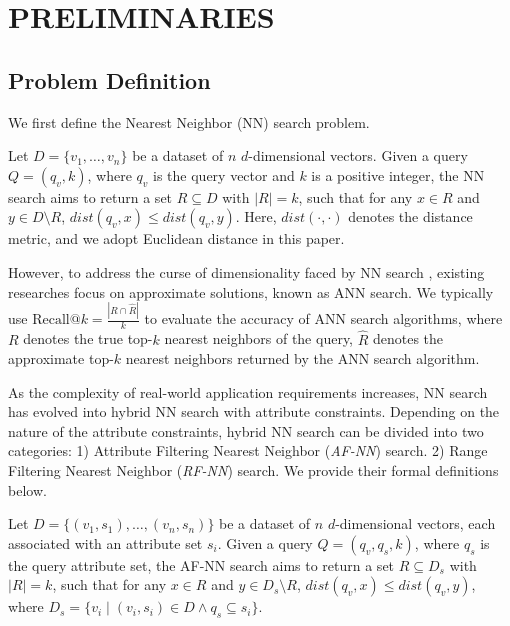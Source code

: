 \documentclass[sigconf, nonacm]{acmart}
\begin{document}
\begin{sloppypar}
\section{PRELIMINARIES}

\subsection{Problem Definition}

We first define the Nearest Neighbor (NN) search problem.

\begin{definition}[NN Search]

Let \( D = \{v_1, \ldots, v_n\} \) be a dataset of \( n \) \( d \)-dimensional vectors. Given a query \( Q = (q_v, k) \), where \( q_v \) is the query vector and \( k \) is a positive integer, the NN search aims to return a set \( R \subseteq D \) with \( |R| = k \), such that for any \( x \in R \) and \( y \in D \setminus R \), \( \textit{dist}\!\left(q_v, x\right) \leq \textit{dist}\!\left(q_v, y\right) \). Here, \( \textit{dist}\!\left(\cdot, \cdot\right) \) denotes the distance metric, and we adopt Euclidean distance in this paper.
\end{definition}

However, to address the curse of dimensionality faced by NN search \cite{dimcurse}, existing researches focus on approximate solutions, known as ANN  search. We typically use $\text{Recall}@k = \frac{|R \cap \hat{R}|}{k}$ to evaluate the accuracy of ANN search algorithms, where $R$ denotes the true top-$k$ nearest neighbors of the query, $\hat{R}$ denotes the approximate top-$k$ nearest neighbors returned by the ANN search algorithm.

As the complexity of real-world application requirements increases, NN search has evolved into hybrid NN search with attribute constraints. Depending on the nature of the attribute constraints, hybrid NN search can be divided into two categories: 1) Attribute Filtering Nearest Neighbor (\textit{AF-NN}) search. 2) Range Filtering Nearest Neighbor (\textit{RF-NN}) search. We provide their formal definitions below.

\begin{definition}[AF-NN Search]
Let \( D = \{(v_1, s_1), \ldots, (v_n, s_n)\} \) be a dataset of \( n \) \( d \)-dimensional vectors, each associated with an attribute set \( s_i \). Given a query \( Q = (q_v, q_s, k) \), where \( q_s \) is the query attribute set, the AF-NN search aims to return a set \( R \subseteq D_s \) with \( |R| = k \), such that for any \( x \in R \) and \( y \in D_s \setminus R \), \( \textit{dist}(q_v, x) \leq \textit{dist}(q_v, y) \), where \( D_s = \{ v_i \mid (v_i, s_i) \in D \land q_s \subseteq s_i \} \).
\end{definition}


\end{sloppypar}
\end{document}
